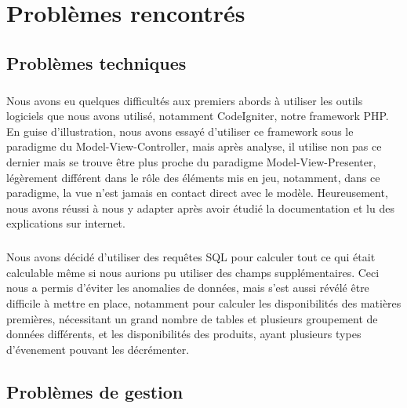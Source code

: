 \chapter{Problèmes rencontrés}


\section{Problèmes techniques}
    \paragraph{}
        Nous avons eu quelques difficultés aux premiers abords à utiliser les 
        outils logiciels que nous avons utilisé, notamment CodeIgniter, notre
        framework PHP.
        En guise d'illustration, nous avons essayé d'utiliser ce framework 
        sous le paradigme du Model-View-Controller, mais après analyse, il
        utilise non pas ce dernier mais se trouve être plus proche du
        paradigme Model-View-Presenter, légèrement différent dans le rôle
        des éléments mis en jeu, notamment, dans ce paradigme, la vue n'est
        jamais en contact direct avec le modèle.
        Heureusement, nous avons réussi à nous y adapter après avoir étudié
        la documentation et lu des explications sur internet.

    \paragraph{}
        Nous avons décidé d'utiliser des requêtes SQL pour calculer tout ce qui
        était calculable même si nous aurions pu utiliser des champs
        supplémentaires.
        Ceci nous a permis d'éviter les anomalies de données, mais s'est aussi
        révélé être difficile à mettre en place, notamment pour calculer les 
        disponibilités des matières premières, nécessitant un grand nombre de 
        tables et plusieurs groupement de données différents, et les
        disponibilités des produits, ayant plusieurs types d'évenement pouvant
        les décrémenter.
        
\section{Problèmes de gestion}
